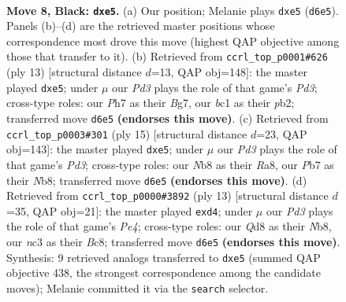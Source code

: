 \documentclass[11pt]{article}
\begin{document}
\begin{figure}[p]\centering
\begin{subfigure}{0.46\textwidth}\centering
\resizebox{\linewidth}{!}{%
\newchessgame
\chessboard[
  setfen={rnbq1rk1/pp3pbp/2pp1np1/4P3/4P2P/2N2N2/PPP1BPP1/R1BQ1RK1 b - - 0 8},
  showmover=false,
  pgfstyle=straightmove, color=movearrow, markmove={d6-e5}
]}
\caption{}
\end{subfigure}\hfill
\begin{subfigure}{0.46\textwidth}\centering
\resizebox{\linewidth}{!}{%
\newchessgame
\chessboard[
  setfen={rnbq1rk1/ppp2pbp/3p1np1/4P3/4P3/2N2N2/PPP1BPPP/R1BQ1RK1 b - - 0 7},
  showmover=false,
  pgfstyle=straightmove, color=movearrow, markmove={d6-e5}
]}
\caption{}
\end{subfigure}
\\[4pt]
\begin{subfigure}{0.46\textwidth}\centering
\resizebox{\linewidth}{!}{%
\newchessgame
\chessboard[
  setfen={rnbq1rk1/1pp2pbp/p2p1np1/4P3/2P1P3/2N2N2/PP2BPPP/R1BQ1RK1 b - - 0 8},
  showmover=false,
  pgfstyle=straightmove, color=movearrow, markmove={d6-e5}
]}
\caption{}
\end{subfigure}\hfill
\begin{subfigure}{0.46\textwidth}\centering
\resizebox{\linewidth}{!}{%
\newchessgame
\chessboard[
  setfen={rnbq1rk1/ppp2pbp/3p1np1/4p3/2PPP3/2N2N2/PP2BPPP/R1BQ1RK1 b - - 1 7},
  showmover=false,
  pgfstyle=straightmove, color=movearrow, markmove={e5-d4}
]}
\caption{}
\end{subfigure}
\caption{\textbf{Move 8, Black: \texttt{dxe5}.} (a) Our position; Melanie plays \texttt{dxe5} (\texttt{d6e5}). Panels (b)--(d) are the retrieved master positions whose correspondence most drove this move (highest QAP objective among those that transfer to it). (b) Retrieved from \texttt{ccrl\_top\_p0001\#626} (ply 13) [structural distance $d$=13, QAP obj=148]: the master played \texttt{dxe5}; under $\mu$ our \emph{Pd3} plays the role of that game's \emph{Pd3}; cross-type roles: our \emph{P}h7 as their \emph{B}g7, our \emph{b}c1 as their \emph{p}b2; transferred move \texttt{d6e5} \textbf{(endorses this move)}. (c) Retrieved from \texttt{ccrl\_top\_p0003\#301} (ply 15) [structural distance $d$=23, QAP obj=143]: the master played \texttt{dxe5}; under $\mu$ our \emph{Pd3} plays the role of that game's \emph{Pd3}; cross-type roles: our \emph{N}b8 as their \emph{R}a8, our \emph{P}b7 as their \emph{N}b8; transferred move \texttt{d6e5} \textbf{(endorses this move)}. (d) Retrieved from \texttt{ccrl\_top\_p0000\#3892} (ply 13) [structural distance $d$=35, QAP obj=21]: the master played \texttt{exd4}; under $\mu$ our \emph{Pd3} plays the role of that game's \emph{Pe4}; cross-type roles: our \emph{Q}d8 as their \emph{N}b8, our \emph{n}c3 as their \emph{B}c8; transferred move \texttt{d6e5} \textbf{(endorses this move)}. Synthesis: 9 retrieved analogs transferred to \texttt{dxe5} (summed QAP objective 438, the strongest correspondence among the candidate moves); Melanie committed it via the \texttt{search} selector.}
\label{fig:thought-m15}
\end{figure}
\end{document}
